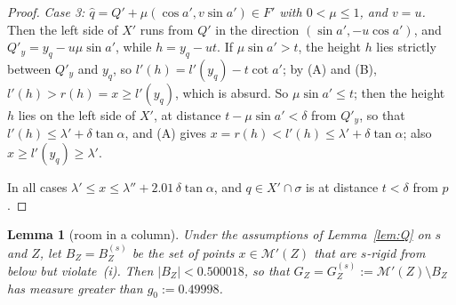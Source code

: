 \documentclass[11pt]{amsart}
\newtheorem{lemma}[theorem]{Lemma}
\theoremstyle{definition}
\theoremstyle{remark}
\begin{document}
\begin{proof}
\emph{Case 3: $\hat q=Q'+\mu(\cos a',v\sin a')\in F'$ with $0<\mu\le1$, and $v=u$.} Then the left side of $X'$ runs from $Q'$ in the
direction $(\sin a',-u\cos a')$, and $Q'_y=y_q-u\mu\sin a'$, while $h=y_q-ut$. If $\mu\sin a'>t$, the height $h$ lies strictly between
$Q'_y$ and $y_q$, so $l'(h)=l'(y_q)-t\cot a'$; by (A) and (B), $l'(h)>r(h)=x\ge l'(y_q)$, which is absurd. So $\mu\sin a'\le t$; then
the height $h$ lies on the left side of $X'$, at distance $t-\mu\sin a'<\delta$ from $Q'_y$, so that $l'(h)\le\lambda'+\delta\tan\alpha$,
and (A) gives $x=r(h)<l'(h)\le\lambda'+\delta\tan\alpha$; also $x\ge l'(y_q)\ge\lambda'$.

In all cases $\lambda'\le x\le\lambda''+2.01\,\delta\tan\alpha$, and $q\in X'\cap\sigma$ is at distance $t<\delta$ from $p$.
\end{proof}

\begin{lemma}[room in a column]\label{lem:GZ}
Under the assumptions of Lemma~\ref{lem:Q} on $s$ and $Z$, let $B_Z=B_Z^{(s)}$ be the set of points $x\in\mathcal M'(Z)$ that are
$s$-rigid from below but violate~(i). Then $|B_Z|<0.500018$, so that $G_Z=G_Z^{(s)}:=\mathcal M'(Z)\setminus B_Z$ has measure greater than
$g_0:=0.49998$.
\end{lemma}
\end{document}
